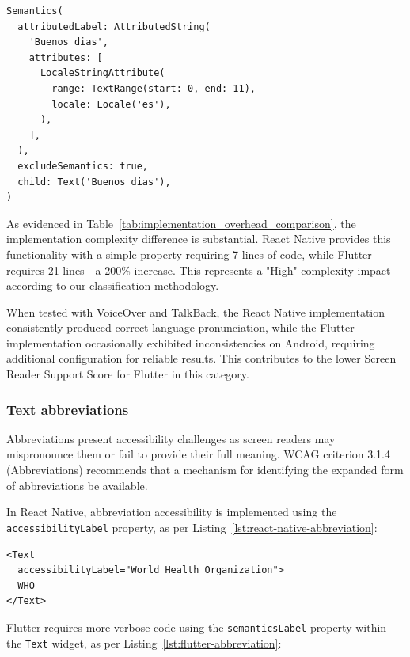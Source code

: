 \begin{lstlisting}[style=DartStyle, caption=Language declaration in Flutter, label=lst:flutter-language]
Semantics(
  attributedLabel: AttributedString(
    'Buenos dias',
    attributes: [
      LocaleStringAttribute(
        range: TextRange(start: 0, end: 11),
        locale: Locale('es'),
      ),
    ],
  ),
  excludeSemantics: true,
  child: Text('Buenos dias'),
)
\end{lstlisting}

As evidenced in Table~\ref{tab:implementation_overhead_comparison}, the implementation complexity difference is substantial. React Native provides this functionality with a simple property requiring 7 lines of code, while Flutter requires 21 lines—a 200\% increase. This represents a "High" complexity impact according to our classification methodology.

When tested with VoiceOver and TalkBack, the React Native implementation consistently produced correct language pronunciation, while the Flutter implementation occasionally exhibited inconsistencies on Android, requiring additional configuration for reliable results. This contributes to the lower Screen Reader Support Score for Flutter in this category.

\subsubsection{Text abbreviations}
\label{subsubsec:text-abbreviations}

Abbreviations present accessibility challenges as screen readers may mispronounce them or fail to provide their full meaning. WCAG criterion 3.1.4 (Abbreviations) recommends that a mechanism for identifying the expanded form of abbreviations be available.

In React Native, abbreviation accessibility is implemented using the \texttt{accessibilityLabel} property, as per Listing~\ref{lst:react-native-abbreviation}:

\begin{lstlisting}[style=ReactNativeStyle, caption=Abbreviation handling in React Native, label=lst:react-native-abbreviation]
<Text
  accessibilityLabel="World Health Organization">
  WHO
</Text>
\end{lstlisting}

Flutter requires more verbose code using the \texttt{semanticsLabel} property within the \texttt{Text} widget, as per Listing~\ref{lst:flutter-abbreviation}:

